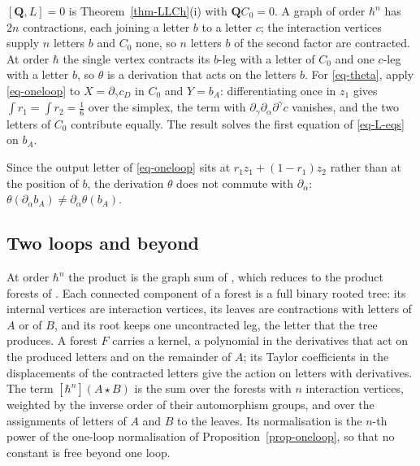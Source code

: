 \documentclass[11pt]{article}
\numberwithin{equation}{section}
\numberwithin{figure}{section}
\numberwithin{table}{section}
\theoremstyle{definition}
\newcommand{\Qp}{\mathbf Q}
\begin{document}
\begin{proofbox}
$[\Qp,L]=0$ is Theorem~\ref{thm-LLCh}(i) with $\Qp C_0=0$. A graph of order $\hbar^n$ has $2n$ contractions, each joining a letter $b$ to a letter $c$; the interaction vertices supply $n$ letters $b$ and $C_0$ none, so $n$ letters $b$ of the second factor are contracted. At order $\hbar$ the single vertex contracts its $b$-leg with a letter of $C_0$ and one $c$-leg with a letter $b$, so $\theta$ is a derivation that acts on the letters $b$. For \eqref{eq-theta}, apply \eqref{eq-oneloop} to $X=\partial_\gamma c_D$ in $C_0$ and $Y=b_A$: differentiating once in $z_1$ gives $\int r_1=\int r_2=\tfrac16$ over the simplex, the term with $\partial_\gamma\partial_\alpha\partial^\gamma c$ vanishes, and the two letters of $C_0$ contribute equally. The result solves the first equation of \eqref{eq-L-eqs} on $b_A$.
\end{proofbox}

Since the output letter of \eqref{eq-oneloop} sits at $r_1z_1+(1-r_1)z_2$ rather than at the position of $b$, the derivation $\theta$ does not commute with $\partial_\alpha$: $\theta(\partial_\alpha b_A)\neq\partial_\alpha\theta(b_A)$.

\subsection{Two loops and beyond}\label{sec-product-twoloop}

At order $\hbar^n$ the product is the graph sum of \cite[Equation~(6.26)]{LLCh}, which reduces to the product forests of \cite[Section~7]{LLCh}. Each connected component of a forest is a full binary rooted tree: its internal vertices are interaction vertices, its leaves are contractions with letters of $A$ or of $B$, and its root keeps one uncontracted leg, the letter that the tree produces. A forest $F$ carries a kernel, a polynomial in the derivatives that act on the produced letters and on the remainder of $A$; its Taylor coefficients in the displacements of the contracted letters give the action on letters with derivatives. The term $[\hbar^n](A\star B)$ is the sum over the forests with $n$ interaction vertices, weighted by the inverse order of their automorphism groups, and over the assignments of letters of $A$ and $B$ to the leaves. Its normalisation is the $n$-th power of the one-loop normalisation of Proposition~\ref{prop-oneloop}, so that no constant is free beyond one loop.
\end{document}
